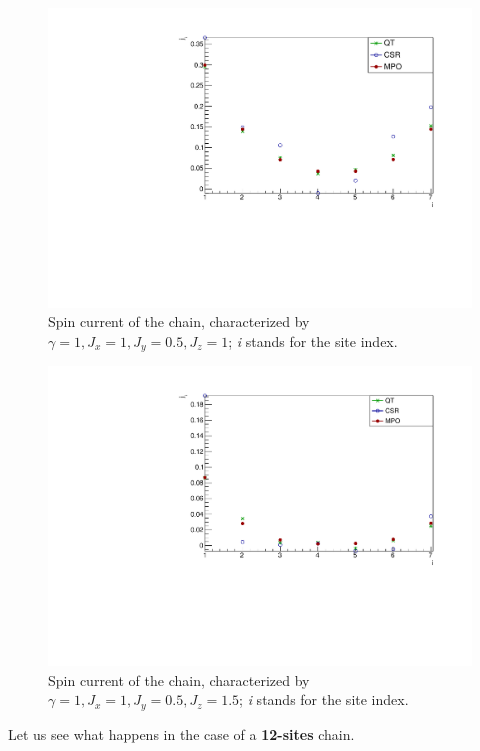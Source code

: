 \begin{figure}[H]
    \centering
    \includegraphics[scale=0.7]{Figures/8sites_comparison/SpinCurr_8s_J1051.pdf}
    \caption{Spin current of the chain, characterized by $\gamma=1, J_x=1, J_y=0.5, J_z=1$; \emph{i} stands for the site index.}
    \label{fig:my_label}
\end{figure}

\begin{figure}[H]
    \centering
    \includegraphics[scale=0.7]{Figures/8sites_comparison/SpinCurr_8s_J10515.pdf}
    \caption{Spin current of the chain, characterized by $\gamma=1, J_x=1, J_y=0.5, J_z=1.5$; \emph{i} stands for the site index.}
    \label{fig:my_label}
\end{figure}

Let us see what happens in the case of a \textbf{12-sites} chain.

